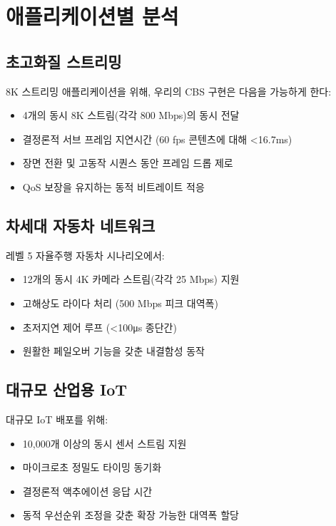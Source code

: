 \documentclass[12pt, a4paper]{article}
\begin{document}
\section{애플리케이션별 분석}

\subsection{초고화질 스트리밍}

8K 스트리밍 애플리케이션을 위해, 우리의 CBS 구현은 다음을 가능하게 한다:

\begin{itemize}
    \item 4개의 동시 8K 스트림(각각 800 Mbps)의 동시 전달
    \item 결정론적 서브 프레임 지연시간 (60 fps 콘텐츠에 대해 <16.7ms)
    \item 장면 전환 및 고동작 시퀀스 동안 프레임 드롭 제로
    \item QoS 보장을 유지하는 동적 비트레이트 적응
\end{itemize}

\subsection{차세대 자동차 네트워크}

레벨 5 자율주행 자동차 시나리오에서:

\begin{itemize}
    \item 12개의 동시 4K 카메라 스트림(각각 25 Mbps) 지원
    \item 고해상도 라이다 처리 (500 Mbps 피크 대역폭)
    \item 초저지연 제어 루프 (<100μs 종단간)
    \item 원활한 페일오버 기능을 갖춘 내결함성 동작
\end{itemize}

\subsection{대규모 산업용 IoT}

대규모 IoT 배포를 위해:

\begin{itemize}
    \item 10,000개 이상의 동시 센서 스트림 지원
    \item 마이크로초 정밀도 타이밍 동기화
    \item 결정론적 액추에이션 응답 시간
    \item 동적 우선순위 조정을 갖춘 확장 가능한 대역폭 할당
\end{itemize}
\end{document}
